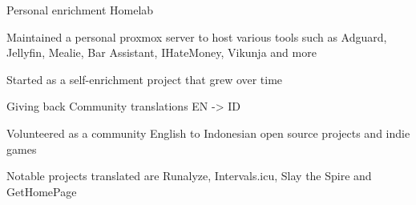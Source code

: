 

\begin{cventries}

  \cventry
    {Personal enrichment} %
    {Homelab} %
    {} %
    {} %
    {
      \begin{cvitems} %
        \item {Maintained a personal proxmox server to host various tools such as Adguard, Jellyfin, Mealie, Bar Assistant, IHateMoney, Vikunja and more}
        \item {Started as a self-enrichment project that grew over time}
      \end{cvitems}
    }

    \cventry
    {Giving back} %
    {Community translations EN -> ID} %
    {} %
    {} %
    {
      \begin{cvitems} %
        \item {Volunteered as a community English to Indonesian open source projects and indie games}
        \item {Notable projects translated are Runalyze, Intervals.icu, Slay the Spire and GetHomePage}
        \end{cvitems}
    }

\end{cventries}
